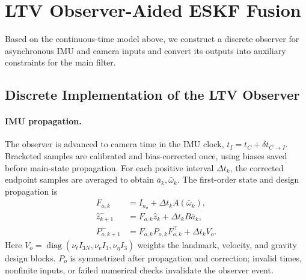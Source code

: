 \documentclass[a4paper,runningheads,twocolumn]{llncs}
\newcommand{\diag}{\operatorname{diag}}
\begin{document}
\section{LTV Observer-Aided ESKF Fusion}
Based on the continuous-time model above, we construct a discrete observer for asynchronous IMU and camera inputs and convert its outputs into auxiliary constraints for the main filter.

\subsection{Discrete Implementation of the LTV Observer}
\label{sec:discrete}
\paragraph{IMU propagation.}
The observer is advanced to camera time in the IMU clock, $t_I=t_C+\delta t_{C\to I}$. Bracketed samples are calibrated and bias-corrected once, using biases saved before main-state propagation. For each positive interval $\Delta t_k$, the corrected endpoint samples are averaged to obtain $\bar a_k,\bar\omega_k$. The first-order state and design propagation is
\begin{equation}
 \begin{aligned}
 F_{o,k}&=I_{n_o}+\Delta t_k A(\bar\omega_k),\\
 \hat z_{k+1}^-&=F_{o,k}\hat z_k+\Delta t_k B\bar a_k,\\
 P_{o,k+1}^-&=F_{o,k}P_{o,k}F_{o,k}^\top+\Delta t_kV_o.
 \end{aligned}
 \label{eq:discreteprop}
\end{equation}
Here $V_o=\diag(\nu_\ell I_{3N},\nu_vI_3,\nu_\eta I_3)$ weights the landmark, velocity, and gravity design blocks. $P_o$ is symmetrized after propagation and correction; invalid times, nonfinite inputs, or failed numerical checks invalidate the observer event.
\end{document}
